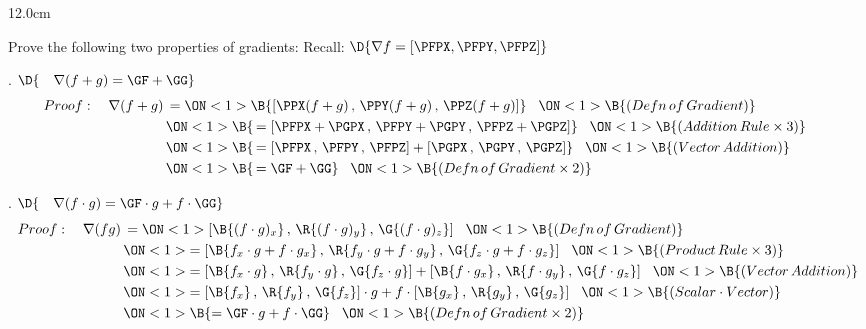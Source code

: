 \begin{frame}
\begin{columns}\begin{column}{12.0cm}

\vspace{0.1cm}

\scriptsize

Prove the following two properties of gradients: \qquad Recall:  $\D{\nabla f = \left[\PFPX,\PFPY,\PFPZ \right]}$

. $\D{\quad \nabla(f+g) = \GF + \GG}$
\begin{align*}
Proof: \quad \nabla(f+g)
&\,=
\ON<1>{\B{ \left[\PPX(f+g)\,,\,\PPY(f+g)\,,\,\PPZ(f+g)\right] }} \hspace{0.3cm} 
\ON<1>{\B{(Defn \, of \, Gradient)}} \hspace{1.9cm}\\
&\,
\ON<1>{\B{\, = \left[\PFPX+\PGPX\,,\,\PFPY+\PGPY\,,\,\PFPZ+\PGPZ\right]}} \hspace{0.3cm} 
\ON<1>{\B{(Addition \, Rule \times3)}} \\
&\,
\ON<1>{\B{\, = \left[\PFPX\,,\,\PFPY\,,\,\PFPZ\right] + \left[\PGPX\,,\,\PGPY\,,\,\PGPZ\right]}} \hspace{0.3cm} 
\ON<1>{\B{(Vector \, Addition)}}\\
&\,
\ON<1>{\B{\, = \GF + \GG}} \hspace{0.3cm} 
\ON<1>{\B{(Defn \, of \, Gradient \times 2)}}
\end{align*}

\vspace{0.4cm}

. $\D{\quad \nabla(f \cdot g) = \GF \cdot g + f \cdot \GG}$
\begin{align*}
Proof: \quad \nabla(fg)
&\,=
\ON<1>{\left[\B{(f \cdot g)_x}\,,\,\R{(f \cdot g)_y}\,,\,\G{(f \cdot g)_z}\right] }\hspace{0.3cm} 
\ON<1>{\B{(Defn \, of \, Gradient)}} \hspace{3.1cm}\\
&\,
\ON<1>{= \left[\B{f_x \cdot g + f  \cdot g_x}\,,\,\R{f_y \cdot g + f \cdot g_y}\,,\,\G{f_z \cdot g + f \cdot g_z}\right]}\hspace{0.3cm} 
\ON<1>{\B{(Product \, Rule \times3)}}\\
&\,
\ON<1>{= \left[\B{f_x \cdot g}\,,\,\R{f_y\cdot g}\,,\,\G{f_z\cdot g}\right] + \left[\B{f \cdot g_x}\,,\,\R{f \cdot g_y}\,,\,\G{f \cdot g_z}\right]} \hspace{0.3cm} 
\ON<1>{\B{(Vector \, Addition)}}\\
&\,
\ON<1>{= \left[\B{f_x} \,,\,\R{f_y}\,,\,\G{f_z}\right] \cdot g + f \cdot \left[\B{g_x}\,,\,\R{g_y}\,,\,\G{g_z}\right]} \hspace{0.3cm} 
\ON<1>{\B{(Scalar \cdot Vector)}}\\
&\,
\ON<1>{\B{= \GF \cdot g + f \cdot \GG}} \hspace{0.3cm} 
\ON<1>{\B{(Defn \, of \, Gradient \times 2)}}
\\
\end{align*}


\end{column}
\end{columns}
\end{frame}
